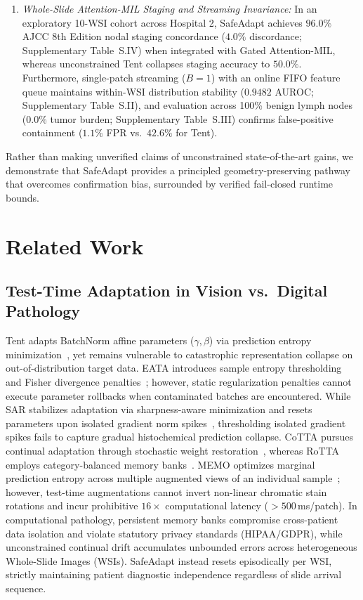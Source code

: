 \documentclass[journal]{IEEEtran}
\begin{document}
\begin{enumerate}
\item \textit{Whole-Slide Attention-MIL Staging and Streaming Invariance:} In an exploratory 10-WSI cohort across Hospital 2, SafeAdapt achieves $96.0\%$ AJCC 8th Edition nodal staging concordance ($4.0\%$ discordance; Supplementary Table~S.IV) when integrated with Gated Attention-MIL, whereas unconstrained Tent collapses staging accuracy to $50.0\%$. Furthermore, single-patch streaming ($B=1$) with an online FIFO feature queue maintains within-WSI distribution stability ($0.9482$ AUROC; Supplementary Table~S.II), and evaluation across 100\% benign lymph nodes (0.0\% tumor burden; Supplementary Table~S.III) confirms false-positive containment ($1.1\%$ FPR vs.\ $42.6\%$ for Tent).
\end{enumerate}

Rather than making unverified claims of unconstrained state-of-the-art gains, we demonstrate that SafeAdapt provides a principled geometry-preserving pathway that overcomes confirmation bias, surrounded by verified fail-closed runtime bounds.

\section{Related Work}
\subsection{Test-Time Adaptation in Vision vs.\ Digital Pathology}
Tent adapts BatchNorm affine parameters ($\gamma, \beta$) via prediction entropy minimization~\cite{wang2021tent}, yet remains vulnerable to catastrophic representation collapse on out-of-distribution target data. EATA introduces sample entropy thresholding and Fisher divergence penalties~\cite{niu2022eata}; however, static regularization penalties cannot execute parameter rollbacks when contaminated batches are encountered. While SAR stabilizes adaptation via sharpness-aware minimization and resets parameters upon isolated gradient norm spikes~\cite{niu2023sar}, thresholding isolated gradient spikes fails to capture gradual histochemical prediction collapse. CoTTA pursues continual adaptation through stochastic weight restoration~\cite{wang2022cotta}, whereas RoTTA employs category-balanced memory banks~\cite{yuan2023rotta}. MEMO optimizes marginal prediction entropy across multiple augmented views of an individual sample~\cite{zhang2022memo}; however, test-time augmentations cannot invert non-linear chromatic stain rotations and incur prohibitive $16\times$ computational latency ($>500$\,ms/patch). In computational pathology, persistent memory banks compromise cross-patient data isolation and violate statutory privacy standards (HIPAA/GDPR), while unconstrained continual drift accumulates unbounded errors across heterogeneous Whole-Slide Images (WSIs). SafeAdapt instead resets episodically per WSI, strictly maintaining patient diagnostic independence regardless of slide arrival sequence.
\end{document}

